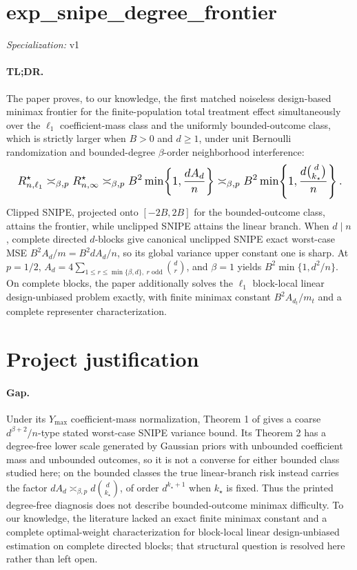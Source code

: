 \documentclass{article}
\begin{document}
\sloppy

\section*{exp\_\allowbreak{}snipe\_\allowbreak{}degree\_\allowbreak{}frontier}

\noindent\textit{Specialization:} v1\par

\paragraph{TL;DR.} The paper proves, to our knowledge, the first matched noiseless design-based minimax frontier for the finite-population total treatment effect simultaneously over the \(\ell_1\) coefficient-mass class and the uniformly bounded-outcome class, which is strictly larger when \(B>0\) and \(d\ge1\), under unit Bernoulli randomization and bounded-degree \(\beta\)-order neighborhood interference:
\[
\makebox[\linewidth][c]{\resizebox{0.98\linewidth}{!}{\(\displaystyle R_{n,\ell_1}^\star\asymp_{\beta,p}R_{n,\infty}^\star
\asymp_{\beta,p}B^2\min\!\left\{1,\frac{dA_d}{n}\right\}
\asymp_{\beta,p}B^2\min\!\left\{1,\frac{d\binom d{k_\star}}{n}\right\}.\)}}
\]
Clipped SNIPE, projected onto \([-2B,2B]\) for the bounded-outcome class, attains the frontier, while unclipped SNIPE attains the linear branch. When \(d\mid n\), complete directed \(d\)-blocks give canonical unclipped SNIPE exact worst-case MSE \(B^2A_d/m=B^2dA_d/n\), so its global variance upper constant one is sharp. At \(p=1/2\), \(A_d=4\sum_{1\le r\le\min\{\beta,d\},\ r\text{ odd}}\binom dr\), and \(\beta=1\) yields \(B^2\min\{1,d^2/n\}\). On complete blocks, the paper additionally solves the \(\ell_1\) block-local linear design-unbiased problem exactly, with finite minimax constant \(B^2A_{d_t}/m_t\) and a complete representer characterization.

\section{Project justification}

\paragraph{Gap.} Under its \(Y_{\max}\) coefficient-mass normalization, Theorem 1 of \cite{CortezRodriguezEichhornYu2023} gives a coarse \(d^{\beta+2}/n\)-type stated worst-case SNIPE variance bound. Its Theorem 2 has a degree-free lower scale generated by Gaussian priors with unbounded coefficient mass and unbounded outcomes, so it is not a converse for either bounded class studied here; on the bounded classes the true linear-branch risk instead carries the factor \(dA_d\asymp_{\beta,p}d\binom d{k_\star}\), of order \(d^{k_\star+1}\) when \(k_\star\) is fixed. Thus the printed degree-free diagnosis does not describe bounded-outcome minimax difficulty. To our knowledge, the literature lacked an exact finite minimax constant and a complete optimal-weight characterization for block-local linear design-unbiased estimation on complete directed blocks; that structural question is resolved here rather than left open.
\end{document}
